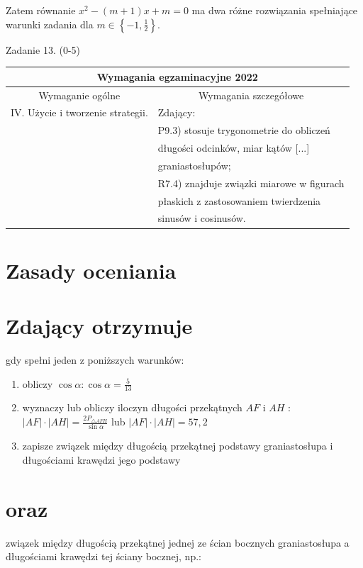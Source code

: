 \documentclass[10pt]{article}
\begin{document}
Zatem równanie $x^{2}-(m+1) x+m=0$ ma dwa różne rozwiązania spełniające warunki zadania dla $m \in\left\{-1, \frac{1}{2}\right\}$.

Zadanie 13. (0-5)

\begin{center}
\begin{tabular}{|l|l|}
\hline
\multicolumn{2}{|c|}{Wymagania egzaminacyjne 2022} \\
\hline
\multicolumn{1}{|c|}{Wymaganie ogólne} & \multicolumn{1}{c|}{Wymagania szczegółowe} \\
\hline
IV. Użycie i tworzenie strategii. & Zdający: \\
 & P9.3) stosuje trygonometrie do obliczeń \\
 & długości odcinków, miar kątów [...] \\
 & graniastosłupów; \\
 & R7.4) znajduje związki miarowe w figurach \\
 & płaskich z zastosowaniem twierdzenia \\
 & sinusów i cosinusów. \\
\hline
\end{tabular}
\end{center}

\section*{Zasady oceniania}
\section*{Zdający otrzymuje}
gdy spełni jeden z poniższych warunków:

\begin{enumerate}
  \item obliczy $\cos \alpha: \cos \alpha=\frac{5}{13}$
  \item wyznaczy lub obliczy iloczyn długości przekątnych $A F$ i $A H$ :\\
$|A F| \cdot|A H|=\frac{2 P_{\triangle A F H}}{\sin \alpha}$ lub $|A F| \cdot|A H|=57,2$
  \item zapisze związek między długością przekątnej podstawy graniastosłupa i długościami krawędzi jego podstawy
\end{enumerate}

\section*{oraz}
związek między długością przekątnej jednej ze ścian bocznych graniastosłupa a długościami krawędzi tej ściany bocznej, np.:
\end{document}
